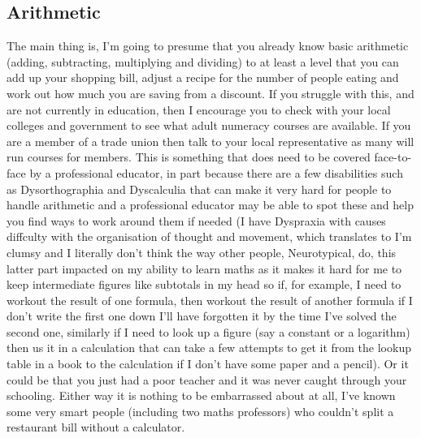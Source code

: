 \subsection{Arithmetic}
The main thing is, I'm going to presume that you already know basic arithmetic (adding, subtracting, multiplying and dividing) to at least a level that you can add up your shopping bill, adjust a recipe for the number of people eating and work out how much you are saving from a discount.  If you struggle with this, and are not currently in education, then I encourage you to check with your local colleges and government to see what adult numeracy courses are available.  If you are a member of a trade union then talk to your local representative as many will run courses for members.  This is something that does need to be covered face-to-face by a professional educator, in part because there are a few disabilities such as Dysorthographia and Dyscalculia that can make it very hard for people to handle arithmetic and a professional educator may be able to spot these and help you find ways to work around them if needed (I have Dyspraxia with causes diffculty with the organisation of thought and movement, which translates to I'm clumsy and I literally don't think the way other people, Neurotypical, do, this latter part impacted on my ability to learn maths as it makes it hard for me to keep intermediate figures like subtotals in my head so if, for example, I need to workout the result of one formula, then workout the result of another formula if I don't write the first one down I'll have forgotten it by the time I've solved the second one, similarly if I need to look up a figure (say a constant or a logarithm) then us it in a calculation that can take a few attempts to get it from the lookup table in a book to the calculation if I don't have some paper and a pencil).  Or it could be that you just had a poor teacher and it was never caught through your schooling.  Either way it is nothing to be embarrassed about at all, I've known some very smart people (including two maths professors) who couldn't split a restaurant bill without a calculator.

